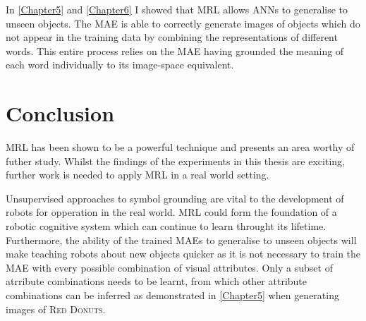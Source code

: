 In \autoref{Chapter5} and \autoref{Chapter6} I showed that \ac{MRL} allows \acp{ANN} to generalise to unseen objects. The \ac{MAE} is able to correctly generate images of objects which do not appear in the training data by combining the representations of different words. This entire process relies on the \ac{MAE} having grounded the meaning of each word individually to its image-space equivalent.


\section{Conclusion}
\ac{MRL} has been shown to be a powerful technique and presents an area worthy of futher study. Whilst the findings of the experiments in this thesis are exciting, further work is needed to apply \ac{MRL} in a real world setting.

Unsupervised approaches to symbol grounding are vital to the development of robots for opperation in the real world. \ac{MRL} could form the foundation of a robotic cognitive system which can continue to learn throught its lifetime. Furthermore, the ability of the trained \acp{MAE} to generalise to unseen objects will make teaching robots about new objects quicker as it is not necessary to train the \ac{MAE} with every possible combination of visual attributes. Only a subset of atrribute combinations needs to be learnt, from which other attribute combinations can be inferred as demonstrated in \autoref{Chapter5} when generating images of \textsc{Red Donuts}.


